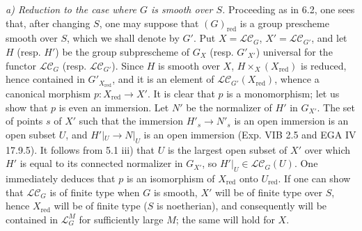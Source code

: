\par\noindent\emph{a) Reduction to the case where $G$ is smooth over $S$.}
Proceeding as in 6.2, one sees that, after changing $S$, one may suppose that $(G)_{\mathrm{red}}$ is a group prescheme smooth over $S$, which we shall denote by $G'$. Put $X=\mathscr{LC}_G$, $X'=\mathscr{LC}_{G'}$, and let $H$ (resp. $H'$) be the group subprescheme of $G_X$ (resp. $G'_{X'}$) universal for the functor $\mathscr{LC}_G$ (resp. $\mathscr{LC}_{G'}$). Since $H$ is smooth over $X$, $H\times_X(X_{\mathrm{red}})$ is reduced, hence contained in $G'_{X_{\mathrm{red}}}$, and it is an element of $\mathscr{LC}_{G'}(X_{\mathrm{red}})$, whence a canonical morphism $p:X_{\mathrm{red}}\to X'$. It is clear that $p$ is a monomorphism; let us show that $p$ is even an immersion. Let $N'$ be the normalizer of $H'$ in $G_{X'}$. The set of points $s$ of $X'$ such that the immersion $H'_s\to N'_s$ is an open immersion is an open subset $U$, and $H'|_U\to N|_U$ is an open immersion (Exp. VIB 2.5 and EGA IV 17.9.5). It follows from 5.1 iii) that $U$ is the largest open subset of $X'$ over which $H'$ is equal to its connected normalizer in $G_{X'}$, so $H'|_U\in\mathscr{LC}_G(U)$. One immediately deduces that $p$ is an isomorphism of $X_{\mathrm{red}}$ onto $U_{\mathrm{red}}$. If one can show that $\mathscr{LC}_G$ is of finite type when $G$ is smooth, $X'$ will be of finite type over $S$, hence $X_{\mathrm{red}}$ will be of finite type ($S$ is noetherian), and consequently will be contained in $\mathscr L_G^M$ for sufficiently large $M$; the same will hold for $X$.

